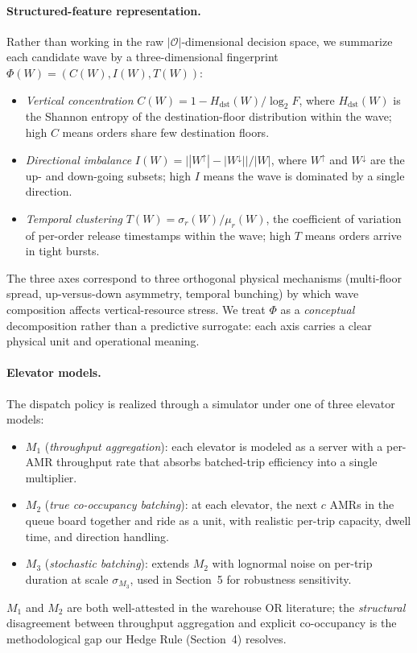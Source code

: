 \documentclass[11pt, a4paper]{article}
\begin{document}
\paragraph{Structured-feature representation.} Rather than working in the raw $|\mathcal{O}|$-dimensional decision space, we summarize each candidate wave by a three-dimensional fingerprint $\Phi(W) = (C(W), I(W), T(W))$:
\begin{itemize}[noitemsep, topsep=2pt, leftmargin=1.5em]
  \item \emph{Vertical concentration} $C(W) = 1 - H_{\text{dst}}(W) / \log_2 F$, where $H_{\text{dst}}(W)$ is the Shannon entropy of the destination-floor distribution within the wave; high $C$ means orders share few destination floors.
  \item \emph{Directional imbalance} $I(W) = \big| |W^{\uparrow}| - |W^{\downarrow}| \big| / |W|$, where $W^{\uparrow}$ and $W^{\downarrow}$ are the up- and down-going subsets; high $I$ means the wave is dominated by a single direction.
  \item \emph{Temporal clustering} $T(W) = \sigma_r(W) / \mu_r(W)$, the coefficient of variation of per-order release timestamps within the wave; high $T$ means orders arrive in tight bursts.
\end{itemize}
The three axes correspond to three orthogonal physical mechanisms (multi-floor spread, up-versus-down asymmetry, temporal bunching) by which wave composition affects vertical-resource stress. We treat $\Phi$ as a \emph{conceptual} decomposition rather than a predictive surrogate: each axis carries a clear physical unit and operational meaning.

\paragraph{Elevator models.} The dispatch policy is realized through a simulator under one of three elevator models:
\begin{itemize}[noitemsep, topsep=2pt, leftmargin=1.5em]
  \item $M_1$ (\emph{throughput aggregation}): each elevator is modeled as a server with a per-AMR throughput rate that absorbs batched-trip efficiency into a single multiplier.
  \item $M_2$ (\emph{true co-occupancy batching}): at each elevator, the next $c$ AMRs in the queue board together and ride as a unit, with realistic per-trip capacity, dwell time, and direction handling.
  \item $M_3$ (\emph{stochastic batching}): extends $M_2$ with lognormal noise on per-trip duration at scale $\sigma_{M_3}$, used in Section~5 for robustness sensitivity.
\end{itemize}
$M_1$ and $M_2$ are both well-attested in the warehouse OR literature; the \emph{structural} disagreement between throughput aggregation and explicit co-occupancy is the methodological gap our Hedge Rule (Section~4) resolves.
\end{document}
